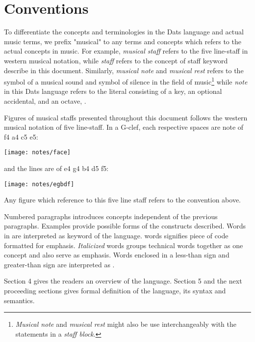 \section{Conventions}

\np To differentiate the concepts and terminologies in the Dats language and
actual music terms, we prefix "musical" to any terms and concepts which
refers to the actual concepts in music. For example, \textit{musical staff} refers
to the five line-staff in western musical notation, while \textit{staff} refers to
the concept of staff keyword describe in this document. Similarly,
\textit{musical note} and \textit{musical rest} refers to the symbol of a musical
sound and symbol of silence in the field of music\footnote{\textit{Musical note} and
\textit{musical rest} might also be use interchangeably with the statements in a
\textit{staff block}.} while \textit{note} in this Dats language refers to the literal
consisting of a key, an optional accidental, and an octave, \protect{}.
 
\np Figures of musical staffs presented throughout this document follows the
western musical notation of five line-staff. In a G-clef, each respective
spaces are note of f4 a4 c5 e5:

\begin{center}
\texttt{[image: notes/face]}
\end{center}

and the lines are of e4 g4 b4 d5 f5:

\begin{center}
\texttt{[image: notes/egbdf]}
\end{center}

Any figure which reference to this five line staff refers to the convention above.

\np 
Numbered paragraphs introduces concepts independent of the previous paragraphs.
Examples provide possible forms of the constructs described. Words in 
are interpreted as keyword of the language.  words signifies piece of code 
formatted for emphasis.  \textit{Italicized} words groups technical words together as one
concept and also serve as emphasis. Words enclosed in a less-than sign and greater-than sign are
interpreted as .

Section 4 gives the readers an overview of the language. Section 5 and the next proceeding sections
gives formal definition of the language, its syntax and semantics.



